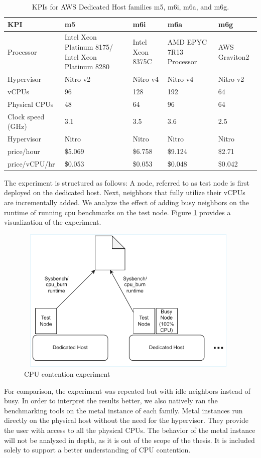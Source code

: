 \renewcommand{\arraystretch}{1.5} %
\begin{table}[h]
\centering
\begin{tabular}{|l|p{2cm}|p{2cm}|p{2cm}|p{2cm}|}
\hline
KPI & m5 & m6i & m6a & m6g \\
\hline
Processor \cite{cloudspecs} & Intel Xeon Platinum 8175/ Intel Xeon Platinum 8280	 & Intel Xeon 8375C & AMD EPYC 7R13 Processor & AWS Graviton2 \\
\hline
Hypervisor \cite{awsEC2GP2025} & Nitro v2 & Nitro v4 & Nitro v4 & Nitro v2 \\
\hline
vCPUs \cite{pricing} & 96 & 128 & 192 & 64 \\
\hline
Physical CPUs \cite{pricing} & 48 & 64 & 96 & 64 \\
\hline
Clock speed (GHz) \cite{vantage} & 3.1 & 3.5 & 3.6 & 2.5\\
\hline
Hypervisor \cite{hypervisorSpec} & Nitro & Nitro & Nitro & Nitro \\
\hline
price/hour \cite{pricing} & \$5.069 & \$6.758 & \$9.124 & \$2.71 \\
\hline
price/vCPU/hr & \$0.053 & \$0.053 & \$0.048 & \$0.042 \\
\hline
\end{tabular}
\caption{KPIs for AWS Dedicated Host families m5, m6i, m6a, and m6g.}
\label{tab:dedicated-hosts}
\end{table}
\noindent
The experiment is structured as follows: A node, referred to as test node 
is first deployed on the dedicated host. Next, neighbors that fully utilize their vCPUs are 
incrementally added. We analyze the effect of adding busy neighbors on the runtime of running 
cpu benchmarks on the test node.
Figure \ref{fig:cpu_exp} provides a visualization of the experiment. 
\begin{figure}[H]
  \centering
  \includegraphics[width=11cm, height=7cm]{figures/cpu_exp}
  \caption{CPU contention experiment}
  \label{fig:cpu_exp}
\end{figure}
\noindent
For comparison, the experiment was repeated but with idle neighbors instead of busy. In order 
to interpret the results better, we also natively ran the benchmarking tools on the metal 
instance of each family. Metal instances run directly on the physical host without the need 
for the hypervisor. They provide the user with access to all the physical 
CPUs. The behavior of the metal instance will not be analyzed in depth, 
as it is out of the scope of the thesis. It is included solely to support a better understanding of 
CPU contention.

